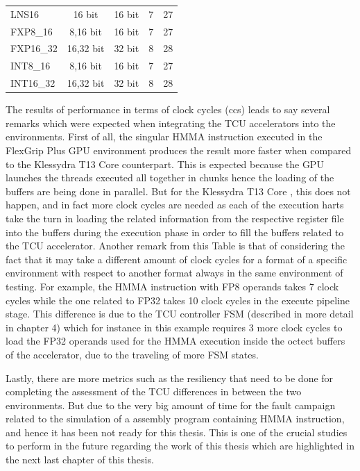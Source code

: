 \begin{table}[htbp]
\begin{tabular}{lcccc}
        LNS16
        & 16 bit
        & 16 bit
        & 7
        & 27 \\

        FXP8\_16
        & 8,16 bit
        & 16 bit
        & 7
        & 27 \\

        FXP16\_32
        & 16,32 bit
        & 32 bit
        & 8
        & 28 \\

        INT8\_16
        & 8,16 bit
        & 16 bit
        & 7
        & 27 \\

        INT16\_32
        & 16,32 bit
        & 32 bit
        & 8
        & 28 \\

        \bottomrule
    \end{tabular}
\end{table}

The results of performance in terms of clock cycles (ccs) leads to say several remarks which were expected when integrating the TCU accelerators into the environments. First of all, the singular HMMA instruction executed in the FlexGrip Plus GPU environment produces the result more faster when compared to the Klessydra T13 Core counterpart. This is expected because the GPU launches the threads executed all together in chunks hence the loading of the buffers are being done in parallel. But for the Klessydra T13 Core , this does not happen, and in fact more clock cycles are needed as each of the execution harts take the turn in loading the related information from the respective register file into the buffers during the execution phase in order to fill the buffers related to the TCU accelerator. Another remark from this Table is that of considering the fact that it may take a different amount of clock cycles for a format of a specific environment with respect to another format always in the same environment of testing. For example, the HMMA instruction with FP8 operands takes 7 clock cycles while the one related to FP32 takes 10 clock cycles in the execute pipeline stage. This difference is due to the TCU controller FSM (described in more detail in chapter 4) which for instance in this example requires 3 more clock cycles to load the FP32 operands used for the HMMA execution inside the octect buffers of the accelerator, due to the traveling of more FSM states. 

Lastly, there are more metrics such as the resiliency that need to be done for completing the assessment of the TCU differences in between the two environments. But due to the very big amount of time for the fault campaign related to the simulation of a assembly program containing HMMA instruction, and hence it has been not ready for this thesis. This is one of the crucial studies to perform in the future regarding the work of this thesis which are highlighted in the next last chapter of this thesis. 

